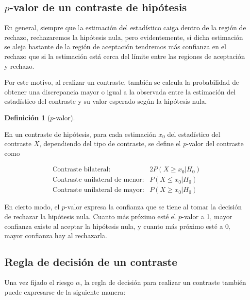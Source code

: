 \documentclass[
  spanish,
  a4paper,
]{scrreport}
\theoremstyle{plain}
\theoremstyle{definition}
\theoremstyle{definition}
\newtheorem{definition}{Definición}[chapter]
\theoremstyle{remark}
\begin{document}
\subsection{\texorpdfstring{\(p\)-valor de un contraste de
hipótesis}{p-valor de un contraste de hipótesis}}\label{p-valor-de-un-contraste-de-hipuxf3tesis}

En general, siempre que la estimación del estadístico caiga dentro de la
región de rechazo, rechazaremos la hipótesis nula, pero evidentemente,
si dicha estimación se aleja bastante de la región de aceptación
tendremos más confianza en el rechazo que si la estimación está cerca
del límite entre las regiones de aceptación y rechazo.

Por este motivo, al realizar un contraste, también se calcula la
probabilidad de obtener una discrepancia mayor o igual a la observada
entre la estimación del estadístico del contraste y su valor esperado
según la hipótesis nula.

\begin{definition}[\(p\)-valor]\protect\hypertarget{def-p-valor}{}\label{def-p-valor}

En un contraste de hipótesis, para cada estimación \(x_0\) del
estadístico del contraste \(X\), dependiendo del tipo de contraste, se
define el \(p\)-valor del contraste como

\[
\begin{array}{lc}
\mbox{Contraste bilateral}: & 2P(X\geq x_0|H_0) \\
\mbox{Contraste unilateral de menor}: & P(X\leq x_0|H_0) \\
\mbox{Contraste unilateral de mayor}: & P(X\geq x_0|H_0)
\end{array}
\]

\end{definition}

En cierto modo, el \(p\)-valor expresa la confianza que se tiene al
tomar la decisión de rechazar la hipótesis nula. Cuanto más próximo esté
el \(p\)-valor a 1, mayor confianza existe al aceptar la hipótesis nula,
y cuanto más próximo esté a 0, mayor confianza hay al rechazarla.

\subsection{Regla de decisión de un
contraste}\label{regla-de-decisiuxf3n-de-un-contraste}

Una vez fijado el riesgo \(\alpha\), la regla de decisión para realizar
un contraste también puede expresarse de la siguiente manera:
\end{document}
